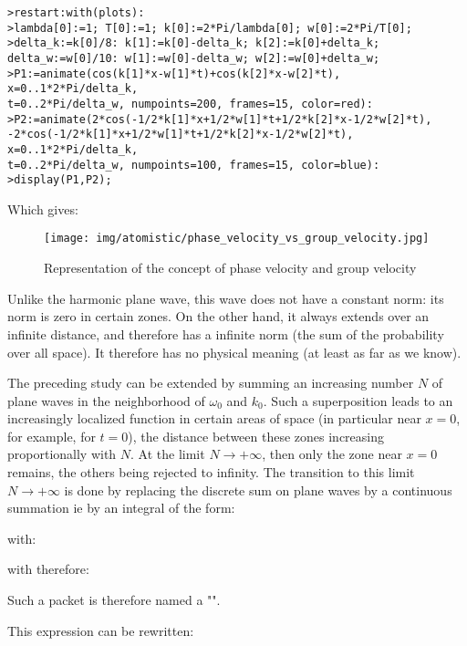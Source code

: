 	\pagebreak
	\texttt{>restart:with(plots):\\
	>lambda[0]:=1; T[0]:=1; k[0]:=2*Pi/lambda[0]; w[0]:=2*Pi/T[0];\\
	>delta\_k:=k[0]/8: k[1]:=k[0]-delta\_k; k[2]:=k[0]+delta\_k;\\
delta\_w:=w[0]/10: w[1]:=w[0]-delta\_w; w[2]:=w[0]+delta\_w;\\
	>P1:=animate(cos(k[1]*x-w[1]*t)+cos(k[2]*x-w[2]*t), x=0..1*2*Pi/delta\_k, \\
	t=0..2*Pi/delta\_w, numpoints=200, frames=15, color=red):\\
	>P2:=animate({2*cos(-1/2*k[1]*x+1/2*w[1]*t+1/2*k[2]*x-1/2*w[2]*t), \\
	-2*cos(-1/2*k[1]*x+1/2*w[1]*t+1/2*k[2]*x-1/2*w[2]*t)}, x=0..1*2*Pi/delta\_k,\\
	 t=0..2*Pi/delta\_w, numpoints=100, frames=15, color=blue):\\
	>display(P1,P2);}
	
	Which gives:
	\begin{figure}[H]
		\centering
		\texttt{[image: img/atomistic/phase\_velocity\_vs\_group\_velocity.jpg]}	
		\caption{Representation of the concept of phase velocity and group velocity}
	\end{figure}
	Unlike the harmonic plane wave, this wave does not have a constant norm: its norm is zero in certain zones. On the other hand, it always extends over an infinite distance, and therefore has a infinite norm (the sum of the probability over all space). It therefore has no physical meaning (at least as far as we know).

	The preceding study can be extended by summing an increasing number $N$ of plane waves in the neighborhood of $\omega_0$ and $k_0$. Such a superposition leads to an increasingly localized function in certain areas of space (in particular near $x=0$, for example, for $t=0$), the distance between these zones increasing proportionally with $N$. At the limit $N\rightarrow +\infty$, then only the zone near $x=0$ remains, the others being rejected to infinity. The transition to this limit  $N\rightarrow +\infty$ is done by replacing the discrete sum on plane waves by a continuous summation ie by an integral of the form:
	
	with:
	
	with therefore:
	
	Such a packet is therefore named a "".

	This expression can be rewritten:
	

